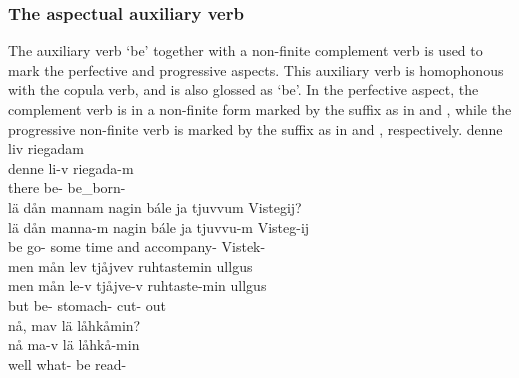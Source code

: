 \subsubsection{The aspectual auxiliary verb }\label{auxV}
The auxiliary verb  ‘be’ %
together with a non-finite complement verb is used to mark the perfective and progressive aspects. This auxiliary verb is homophonous with the copula verb, and is also glossed as ‘be’.
In the perfective aspect, the complement verb is in a non-finite form marked by the suffix  as in  and , while the progressive non-finite verb is marked by the suffix  %
as in  and , respectively.
\ea\label{perfClause1}%
\glll	denne liv riegadam\\
	denne li-v riegada-m\\
	there be- be\_born-\\\nopagebreak
{} 
\z
\ea\label{perfClause2}%
\glll	lä dån mannam nagin bále ja tjuvvum Vistegij?\\
	lä dån manna-m nagin bále ja tjuvvu-m Visteg-ij\\
	be\BS{}  go- some time\BS{} and accompany- Vistek-\\\nopagebreak
{} 
\z
\ea\label{progClause1}%
\glll	men mån lev tjåjvev ruhtastemin ullgus\\
	men mån le-v tjåjve-v ruhtaste-min ullgus\\
	but  be- stomach- cut- out\\\nopagebreak
{} 
\z
\ea\label{progClause2}
\glll	nå, mav lä låhkåmin?\\
	nå ma-v lä låhkå-min\\
	well what- be\BS{} read-\\\nopagebreak
{} 
\z


